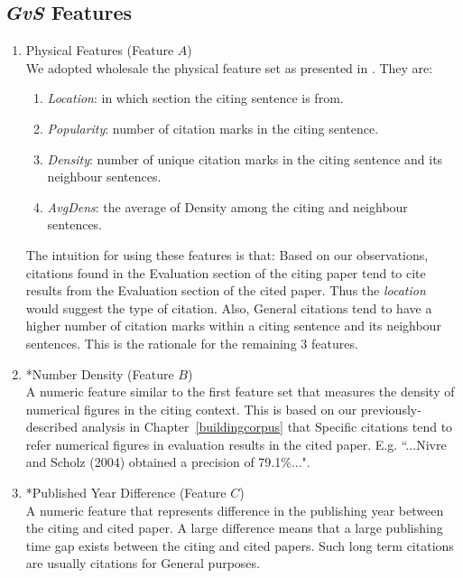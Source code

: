 \subsection*{{\it GvS} Features}
\begin{enumerate}
\item Physical Features (Feature $A$)\\
We adopted wholesale the physical feature set as presented in \cite{dongensemble}. They are:
\begin{enumerate}
\item \textit{Location}: in which section the citing sentence is from.
\item \textit{Popularity}: number of citation marks in the citing sentence.
\item \textit{Density}: number of unique citation marks in the citing sentence and its neighbour sentences.
\item \textit{AvgDens}: the average of Density among the citing and neighbour sentences.
\end{enumerate}

The intuition for using these features is that: Based on our observations, citations found in the Evaluation section of the citing paper tend to cite results from the Evaluation section of the cited paper. Thus the \textit{location} would suggest the type of citation. Also, General citations tend to have a higher number of citation marks within a citing sentence and its neighbour sentences. This is the rationale for the remaining 3 features.


\item *Number Density (Feature $B$)\\
A numeric feature similar to the first feature set that measures the density of numerical figures in the citing context. This is based on our previously-described analysis in Chapter~\ref{buildingcorpus} that Specific citations tend to refer numerical figures in evaluation results in the cited paper. E.g. ``...Nivre and Scholz (2004) obtained a precision of 79.1\%...".

\item *Published Year Difference (Feature $C$)\\
A numeric feature that represents difference in the publishing year between the citing and cited paper. A large difference means that a large publishing time gap exists between the citing and cited papers.  Such long term citations are usually citations for General purposes.


\end{enumerate}
